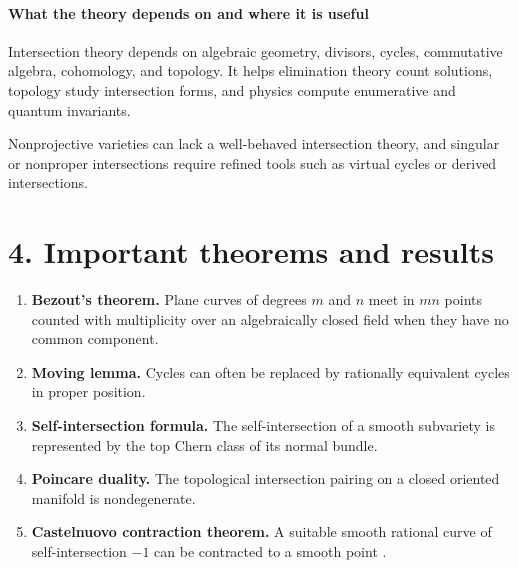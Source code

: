 \paragraph{What the theory depends on and where it is useful}
Intersection theory depends on algebraic geometry, divisors, cycles, commutative algebra, cohomology, and topology. It helps elimination theory count solutions, topology study intersection forms, and physics compute enumerative and quantum invariants.

Nonprojective varieties can lack a well-behaved intersection theory, and singular or nonproper intersections require refined tools such as virtual cycles or derived intersections.

\section*{4. Important theorems and results}
\begin{enumerate}[leftmargin=*,itemsep=0.35em]
\item \textbf{Bezout's theorem.} Plane curves of degrees $m$ and $n$ meet in $mn$ points counted with multiplicity over an algebraically closed field when they have no common component.

\item \textbf{Moving lemma.} Cycles can often be replaced by rationally equivalent cycles in proper position.

\item \textbf{Self-intersection formula.} The self-intersection of a smooth subvariety is represented by the top Chern class of its normal bundle.

\item \textbf{Poincare duality.} The topological intersection pairing on a closed oriented manifold is nondegenerate.

\item \textbf{Castelnuovo contraction theorem.} A suitable smooth rational curve of self-intersection $-1$ can be contracted to a smooth point \cite{intersection_theory_ref2}.
\end{enumerate}

\theoryapplications
{}
